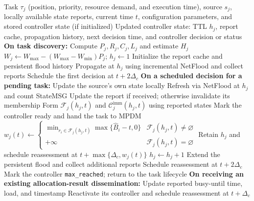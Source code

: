 \documentclass[type=submission,name=IR]{oae}
\begin{document}
\begin{algorithm}[htb]
\caption{Protected Progressive Adaptive TTL (PP-AT)}
\label{alg:ppat}
\small
\begin{algorithmic}[1]
\Require Task $\tau_j$ (position, priority, resource demand, and execution time), source $s_j$, locally available state reports, current time $t$, configuration parameters, and stored controller state (if initialized)
\Ensure Updated controller state: TTL $h_j$, report cache, propagation history, next decision time, and controller decision or status
\Statex \textbf{On task discovery:}
\State Compute $P_j,R_j,C_j,L_j$ and estimate $H_j$
\State $W_j\gets W_{\max}-(W_{\max}-W_{\min})P_j$; $h_j\gets1$
\State Initialize the report cache and persistent flood history
\State Propagate at $h_j$ using incremental NetFlood and collect reports
\State Schedule the first decision at $t+2\Delta_c$
\Statex \textbf{On a scheduled decision for a pending task:}
\State Update the source's own state locally
    \State Refresh via NetFlood at $h_j$ and count StateMSG
    \State Update the report if received; otherwise invalidate its membership
\EndFor
\State Form $\mathcal{F}_j(h_j,t)$ and $\mathcal{C}^{\mathrm{imm}}_j(h_j,t)$ using reported states
    \State Mark the controller ready and hand the task to MPDM
\Else
    \State $w_j(t)\gets\begin{cases}
        \displaystyle\min_{r_i\in\mathcal{F}_j(h_j,t)}\max\{\widehat B_i-t,0\}
        &\mathcal{F}_j(h_j,t)\neq\varnothing\\
        +\infty&\mathcal{F}_j(h_j,t)=\varnothing
    \end{cases}$
        \State Retain $h_j$ and schedule reassessment at $t+\max\{\Delta_c,w_j(t)\}$
        \State $h_j\gets h_j+1$
        \State Extend the persistent flood and collect additional reports
        \State Schedule reassessment at $t+2\Delta_c$
    \Else
        \State Mark the controller \texttt{max\_reached}; return to the task lifecycle
    \EndIf
\EndIf
\Statex \textbf{On receiving an existing allocation-result dissemination:}
    \State Update reported busy-until time, load, and timestamp
    \State Reactivate its controller and schedule reassessment at $t+\Delta_c$
\EndFor
\end{algorithmic}
\end{algorithm}
\end{document}
